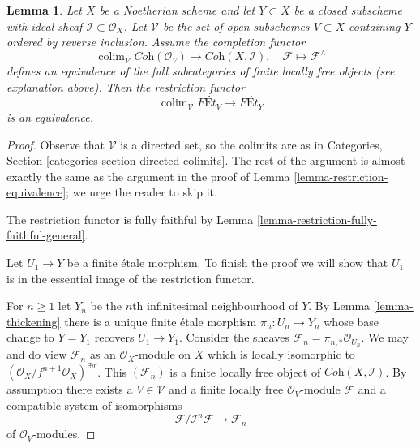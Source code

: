 \documentclass{stacks-project}
\theoremstyle{plain}
\newtheorem{lemma}[subsection]{Lemma}
\theoremstyle{definition}
\theoremstyle{remark}
\numberwithin{equation}{subsection}
\def\colim{\mathop{\mathrm{colim}}\nolimits}
\begin{document}
\begin{lemma}
\label{lemma-restriction-equivalence-general}
Let $X$ be a Noetherian scheme and let $Y \subset X$ be a closed subscheme
with ideal sheaf $\mathcal{I} \subset \mathcal{O}_X$.
Let $\mathcal{V}$ be the set of open subschemes $V \subset X$ containing $Y$
ordered by reverse inclusion. Assume the completion functor
$$
\colim_\mathcal{V} \textit{Coh}(\mathcal{O}_V)
\longrightarrow
\textit{Coh}(X, \mathcal{I}),
\quad
\mathcal{F} \longmapsto \mathcal{F}^\wedge
$$
defines an equivalence of the full subcategories of
finite locally free objects (see explanation above).
Then the restriction functor
$$
\colim_\mathcal{V} \textit{F\'Et}_V \to \textit{F\'Et}_Y
$$
is an equivalence.
\end{lemma}

\begin{proof}
Observe that $\mathcal{V}$ is a directed set, so the colimits are
as in Categories, Section \ref{categories-section-directed-colimits}.
The rest of the argument is almost exactly the same as the argument
in the proof of Lemma \ref{lemma-restriction-equivalence}; we urge
the reader to skip it.

\medskip\noindent
The restriction functor is fully faithful by
Lemma \ref{lemma-restriction-fully-faithful-general}.

\medskip\noindent
Let $U_1 \to Y$ be a finite \'etale morphism. To finish the proof
we will show that $U_1$ is in the essential image of the
restriction functor.

\medskip\noindent
For $n \geq 1$ let $Y_n$ be the $n$th infinitesimal neighbourhood of $Y$.
By Lemma \ref{lemma-thickening}
there is a unique finite \'etale morphism
$\pi_n : U_n \to Y_n$ whose base change to $Y = Y_1$
recovers $U_1 \to Y_1$.
Consider the sheaves $\mathcal{F}_n = \pi_{n, *}\mathcal{O}_{U_n}$.
We may and do view $\mathcal{F}_n$ as an $\mathcal{O}_X$-module on $X$
which is locally isomorphic to
$(\mathcal{O}_X/f^{n + 1}\mathcal{O}_X)^{\oplus r}$.
This $(\mathcal{F}_n)$ is a finite locally free object of
$\textit{Coh}(X, \mathcal{I})$.
By assumption there exists a $V \in \mathcal{V}$
and a finite locally free $\mathcal{O}_V$-module $\mathcal{F}$
and a compatible system of isomorphisms
$$
\mathcal{F}/\mathcal{I}^n\mathcal{F} \to \mathcal{F}_n
$$
of $\mathcal{O}_V$-modules.


\end{proof}
\end{document}
